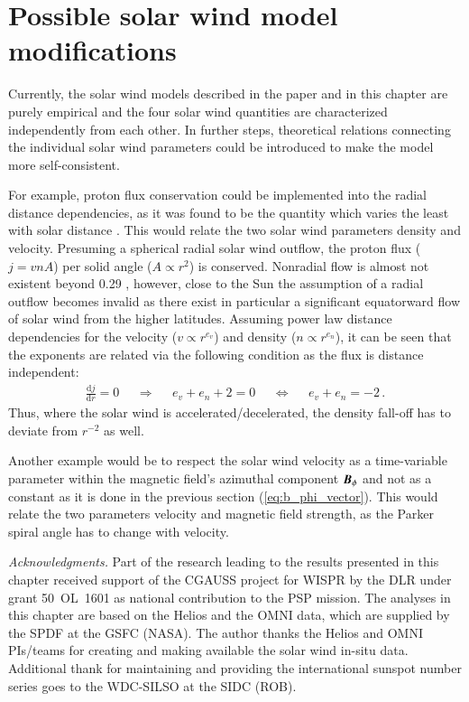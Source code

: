 \section{Possible solar wind model modifications}
\label{sec:possible_solar_wind_model_modifications}
Currently, the solar wind models described in the paper and in this chapter are purely empirical and the four solar wind quantities are characterized independently from each other. In further steps, theoretical relations connecting the individual solar wind parameters could be introduced to make the model more self-consistent.

For example, proton flux conservation could be implemented into the radial distance dependencies, as it was found to be the quantity which varies the least with solar distance \citep{Schwenn1983}. This would relate the two solar wind parameters density and velocity. Presuming a spherical radial solar wind outflow, the proton flux ($j = v n A$) per solid angle ($A \propto r^2$) is conserved. Nonradial flow is almost not existent beyond \SI{0.29}{\au} \citep{Schwenn1983}, however, close to the Sun the assumption of a radial outflow becomes invalid as there exist in particular a significant equatorward flow of solar wind from the higher latitudes. Assuming power law distance dependencies for the velocity ($v \propto r^{e_v}$) and density ($n \propto r^{e_n}$), it can be seen that the exponents are related via the following condition as the flux is distance independent:
\begin{align}
	\frac{\text{d}j}{\text{d}r} = 0	&	&\Rightarrow	&	&e_v + e_n + 2 = 0	&	&\Leftrightarrow	&	&e_v + e_n = -2	\,.	\nonumber
\end{align}
Thus, where the solar wind is accelerated/decelerated, the density fall-off has to deviate from $r^{-2}$ as well.

Another example would be to respect the solar wind velocity as a time-variable parameter within the magnetic field's azimuthal component $\boldsymbol{B}_\phi$ and not as a constant as it is done in the previous section (\autoref{eq:b_phi_vector}). This would relate the two parameters velocity and magnetic field strength, as the Parker spiral angle has to change with velocity.


\bigskip
{\small
\noindent \textit{Acknowledgments.} Part of the research leading to the results presented in this chapter received support of the CGAUSS project for WISPR by the DLR under grant 50~OL~1601 as national contribution to the PSP mission.
The analyses in this chapter are based on the Helios and the OMNI data, which are supplied by the SPDF at the GSFC (NASA). The author thanks the Helios and OMNI PIs/teams for creating and making available the solar wind in-situ data. Additional thank for maintaining and providing the international sunspot number series goes to the WDC-SILSO at the SIDC (ROB).
}


\cleardoublepage

